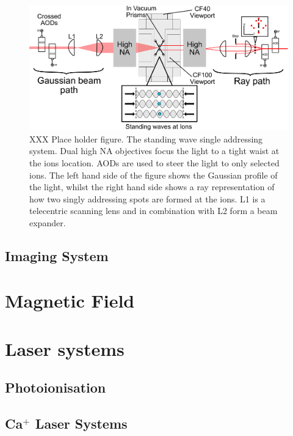 \documentclass[12pt]{report}
\begin{document}
\begin{figure}
  \begin{center}
   \noindent\includegraphics[width=\linewidth]{figures/pdf_figure/vac_can_AOD_small.pdf}
  \end{center}
  \caption{XXX Place holder figure. The standing wave single addressing system. Dual high NA
    objectives focus the light to a tight waist at the ions
    location. AODs are used to steer the light to only selected
    ions. The left hand side of the figure shows the Gaussian profile
    of the light, whilst the right hand side shows a ray
    representation of how two singly addressing spots are formed at
    the ions. L1 is a telecentric scanning lens and in combination
    with L2 form a beam expander.}
  \label{fig:AOD}
\end{figure}

\subsection{Imaging System}

\section{Magnetic Field}
\label{sec:Magnetic Field}

\section{Laser systems}
\label{sec:Laser systems}
\subsection{Photoionisation}
\subsection{Ca$^+$ Laser Systems}	
\label{sec:Ca+ Laser Systems}
\end{document}
